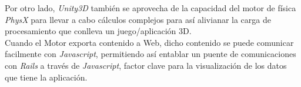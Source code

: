 Por otro lado, \emph{Unity3D} también se aprovecha de la capacidad del motor de física \emph{PhysX} para llevar a cabo cálculos complejos para así alivianar la carga de procesamiento que conlleva un juego/aplicación 3D.\\

Cuando el Motor exporta contenido a Web, dicho contenido se puede comunicar facilmente con \emph{Javascript}, permitiendo así entablar un puente de comunicaciones con \emph{Rails} a través de \emph{Javascript}, factor clave para la visualización de los datos que tiene la aplicación.\\

